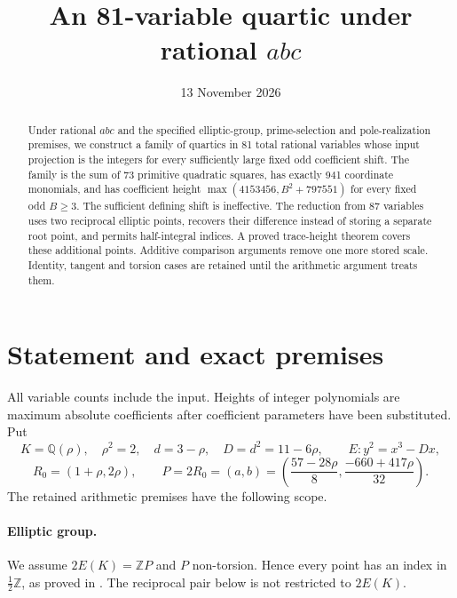 \documentclass[11pt,a4paper]{article}
\title{An 81-variable quartic under rational $abc$}
\author{}\date{13 November 2026}
\newcommand{\Q}{\mathbb Q}\newcommand{\Z}{\mathbb Z}\DeclareMathOperator{\Tr}{Tr}\DeclareMathOperator{\Nm}{Nm}\DeclareMathOperator{\rad}{rad}
\begin{document}
\maketitle
\begin{abstract}
Under rational $abc$ and the specified elliptic-group, prime-selection
and pole-realization premises, we construct a family of quartics in
81 total rational variables whose input projection is the integers
for every sufficiently large fixed odd coefficient shift. The family
is the sum of 73 primitive quadratic squares, has exactly 941
coordinate monomials, and has coefficient height
$\max(4153456,B^2+797551)$ for every fixed odd $B\ge3$.
The sufficient defining shift is ineffective.
The reduction from 87 variables uses two reciprocal elliptic points,
recovers their difference instead of storing a separate root point,
and permits half-integral indices. A proved trace-height theorem
covers these additional points. Additive comparison arguments remove
one more stored scale. Identity, tangent and torsion cases are retained
until the arithmetic argument treats them.
\end{abstract}

\section{Statement and exact premises}
All variable counts include the input. Heights of integer polynomials
are maximum absolute coefficients after coefficient parameters have
been substituted. Put
\[
 K=\Q(\rho),\quad\rho^2=2,\quad d=3-\rho,\quad D=d^2=11-6\rho,
 \qquad E:y^2=x^3-Dx,
\]
\[
 R_0=(1+\rho,2\rho),\qquad
 P=2R_0=(a,b)=\left(\frac{57-28\rho}{8},\frac{-660+417\rho}{32}\right).
\]
The retained arithmetic premises have the following scope.

\paragraph{Elliptic group.}
We assume $2E(K)=\Z P$ and $P$ non-torsion. Hence every point has
an index in $\frac12\Z$, as proved in \cite[Corollary 1.3]{TraceAll}.
The reciprocal pair below is not restricted to $2E(K)$.
\end{document}

